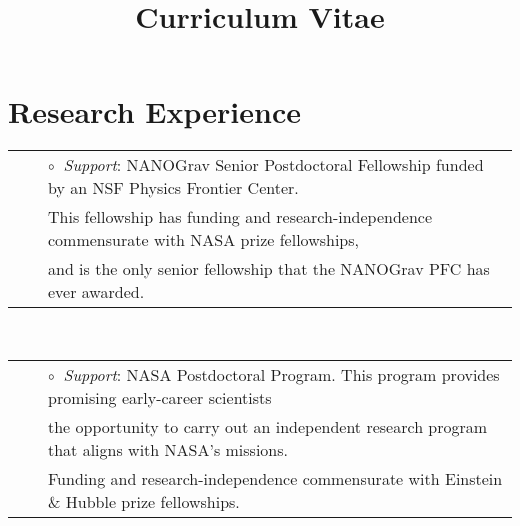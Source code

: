 \documentclass[11pt,letterpaper,sans]{moderncv}
\title{Curriculum Vitae}
\begin{document}
\makecvtitle 


\section{Research Experience}

 \vspace{-6mm}
\begin{tabular}{rcl}
&\hspace{0.4cm} &{\color{color1} $\circ\;\;$}{\textit{Support}}: NANOGrav Senior Postdoctoral Fellowship funded by an NSF Physics Frontier Center. \\
&\hspace{0.4cm} &  \hspace{0.4cm}This fellowship has funding and research-independence commensurate with NASA prize fellowships, \\
&\hspace{0.4cm} &  \hspace{0.4cm}and is the only senior fellowship that the NANOGrav PFC has ever awarded. \\
\end{tabular}\\ 
\vspace{1mm}

 \vspace{-6mm}
\begin{tabular}{rcl}
&\hspace{0.4cm} &{\color{color1} $\circ\;\;$}{\textit{Support}}: NASA Postdoctoral Program. This program provides promising early-career scientists \\
&\hspace{0.4cm} &  \hspace{0.4cm}the opportunity to carry out an independent research program that aligns with NASA's missions. \\
&\hspace{0.4cm} &  \hspace{0.4cm}Funding and research-independence commensurate with Einstein \& Hubble prize fellowships. \\
\end{tabular}\\ 
\vspace{1mm}
\end{document}
